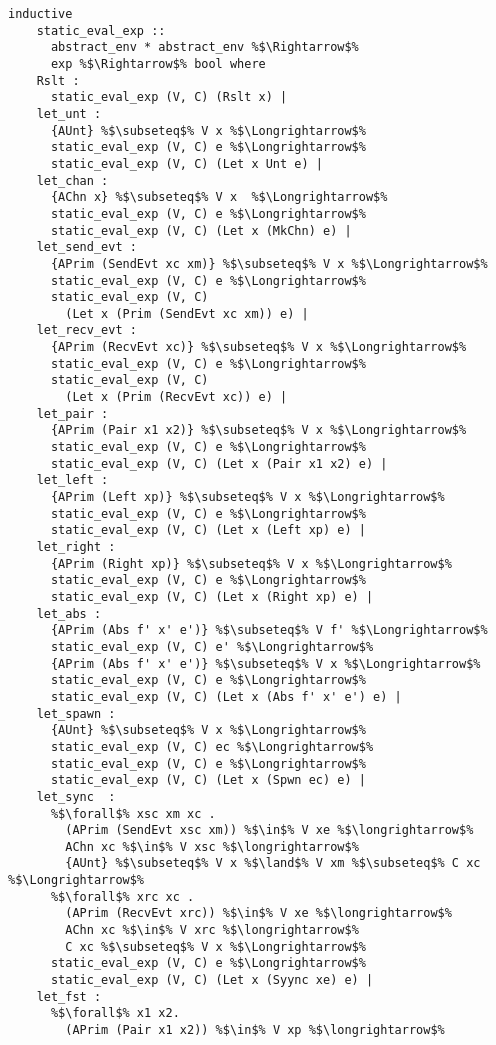 \begin{lstlisting}[style=codestyle1, escapechar=\%]
  inductive
    static_eval_exp ::
      abstract_env * abstract_env %$\Rightarrow$%
      exp %$\Rightarrow$% bool where
    Rslt :
      static_eval_exp (V, C) (Rslt x) |
    let_unt :
      {AUnt} %$\subseteq$% V x %$\Longrightarrow$%
      static_eval_exp (V, C) e %$\Longrightarrow$% 
      static_eval_exp (V, C) (Let x Unt e) |
    let_chan : 
      {AChn x} %$\subseteq$% V x  %$\Longrightarrow$%
      static_eval_exp (V, C) e %$\Longrightarrow$%
      static_eval_exp (V, C) (Let x (MkChn) e) |
    let_send_evt : 
      {APrim (SendEvt xc xm)} %$\subseteq$% V x %$\Longrightarrow$%
      static_eval_exp (V, C) e %$\Longrightarrow$% 
      static_eval_exp (V, C)
        (Let x (Prim (SendEvt xc xm)) e) |
    let_recv_evt :
      {APrim (RecvEvt xc)} %$\subseteq$% V x %$\Longrightarrow$%
      static_eval_exp (V, C) e %$\Longrightarrow$% 
      static_eval_exp (V, C)
        (Let x (Prim (RecvEvt xc)) e) |
    let_pair : 
      {APrim (Pair x1 x2)} %$\subseteq$% V x %$\Longrightarrow$%
      static_eval_exp (V, C) e %$\Longrightarrow$% 
      static_eval_exp (V, C) (Let x (Pair x1 x2) e) |
    let_left : 
      {APrim (Left xp)} %$\subseteq$% V x %$\Longrightarrow$%
      static_eval_exp (V, C) e %$\Longrightarrow$% 
      static_eval_exp (V, C) (Let x (Left xp) e) |
    let_right :
      {APrim (Right xp)} %$\subseteq$% V x %$\Longrightarrow$%
      static_eval_exp (V, C) e %$\Longrightarrow$% 
      static_eval_exp (V, C) (Let x (Right xp) e) |
    let_abs : 
      {APrim (Abs f' x' e')} %$\subseteq$% V f' %$\Longrightarrow$%
      static_eval_exp (V, C) e' %$\Longrightarrow$%
      {APrim (Abs f' x' e')} %$\subseteq$% V x %$\Longrightarrow$%
      static_eval_exp (V, C) e %$\Longrightarrow$% 
      static_eval_exp (V, C) (Let x (Abs f' x' e') e) |
    let_spawn :
      {AUnt} %$\subseteq$% V x %$\Longrightarrow$%
      static_eval_exp (V, C) ec %$\Longrightarrow$% 
      static_eval_exp (V, C) e %$\Longrightarrow$%  
      static_eval_exp (V, C) (Let x (Spwn ec) e) |
    let_sync  : 
      %$\forall$% xsc xm xc . 
        (APrim (SendEvt xsc xm)) %$\in$% V xe %$\longrightarrow$% 
        AChn xc %$\in$% V xsc %$\longrightarrow$%
        {AUnt} %$\subseteq$% V x %$\land$% V xm %$\subseteq$% C xc %$\Longrightarrow$%
      %$\forall$% xrc xc . 
        (APrim (RecvEvt xrc)) %$\in$% V xe %$\longrightarrow$%
        AChn xc %$\in$% V xrc %$\longrightarrow$%
        C xc %$\subseteq$% V x %$\Longrightarrow$%
      static_eval_exp (V, C) e %$\Longrightarrow$%  
      static_eval_exp (V, C) (Let x (Syync xe) e) |
    let_fst : 
      %$\forall$% x1 x2.
        (APrim (Pair x1 x2)) %$\in$% V xp %$\longrightarrow$%

\end{lstlisting}
